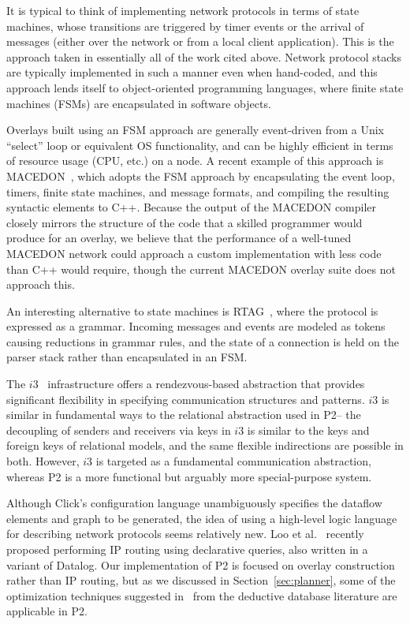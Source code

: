 \documentclass{sig-alt-full}
\def\Sys{P2\xspace}
\begin{document}
It is typical to think of implementing network protocols in terms of
state machines, whose transitions are triggered by timer events or the
arrival of messages (either over the network or from a local client
application).  This is the approach taken in essentially all of the
work cited above.  Network protocol stacks are typically implemented
in such a manner even when hand-coded, and this approach lends itself
to object-oriented programming languages, where finite state machines (FSMs) are encapsulated
in software objects.  

Overlays built using an FSM approach are generally event-driven from a
Unix ``select'' loop or equivalent OS functionality, and can be highly
efficient in terms of resource usage (CPU, etc.) on a node.  A recent
example of this approach is MACEDON~\cite{rodriguez04macedon}, which
adopts the FSM approach by
encapsulating the event loop, timers, finite state 
machines, and message formats, and compiling the resulting syntactic
elements to C++.   Because the output of the MACEDON compiler closely
mirrors the structure of the code that a skilled programmer would
produce for an overlay, we believe that the performance of a
well-tuned MACEDON network could approach a custom implementation with
less code than C++ would require, though the current MACEDON overlay
suite does not approach this. 

An interesting alternative to state machines is
RTAG~\cite{anderson88rtag}, 
where the protocol is expressed as a grammar.  Incoming messages and
events are modeled as tokens causing reductions in grammar rules, and
the state of a connection is held on the parser stack rather than
encapsulated in an FSM.  

The $i3$~\cite{i3} infrastructure offers a rendezvous-based
abstraction that provides significant flexibility in specifying
communication structures and patterns.  $i3$ is similar in fundamental
ways to the relational abstraction used in \Sys -- the decoupling of
senders and receivers via keys in $i3$ is similar to the keys and
foreign keys of relational models, and the same flexible indirections
are possible in both.  However, $i3$ is targeted as a fundamental
communication abstraction, whereas \Sys is a more functional but
arguably more special-purpose system.

Although Click's configuration language unambiguously specifies the
dataflow elements and graph to be generated, the idea of using a
high-level logic language for describing network protocols seems
relatively new.  Loo et al.~\cite{loo-hotnets04} recently proposed
performing IP routing using declarative queries, also written in a
variant of Datalog.  Our implementation of \Sys is focused on overlay
construction rather than IP routing, but as we discussed in
Section~\ref{sec:planner}, some of the optimization techniques
suggested in~\cite{loo-hotnets04} from the deductive database
literature are applicable in \Sys. 
\end{document}
